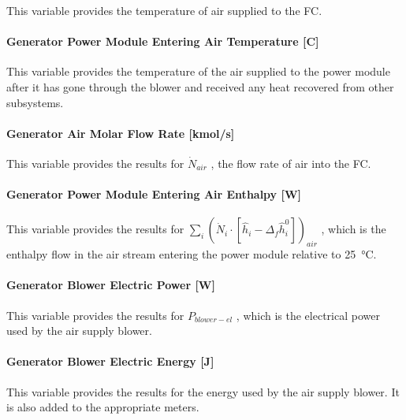 This variable provides the temperature of air supplied to the FC.

\paragraph{Generator Power Module Entering Air Temperature {[}C{]}}\label{generator-power-module-entering-air-temperature-c}

This variable provides the temperature of the air supplied to the power module after it has gone through the blower and received any heat recovered from other subsystems.

\paragraph{Generator Air Molar Flow Rate {[}kmol/s{]}}\label{generator-air-molar-flow-rate-kmols}

This variable provides the results for \({\dot N_{air}}\) , the flow rate of air into the FC.

\paragraph{Generator Power Module Entering Air Enthalpy {[}W{]}}\label{generator-power-module-entering-air-enthalpy-w}

This variable provides the results for \({\sum\limits_i {\left( {{{\dot N}_i} \cdot \left[ {{{\hat h}_i} - {\Delta_f}\hat h_i^0} \right]} \right)}_{air}}\) , which is the enthalpy flow in the air stream entering the power module relative to \SI{25}{\celsius}.

\paragraph{Generator Blower Electric Power {[}W{]}}\label{generator-blower-electric-power-w}

This variable provides the results for \({P_{blower - el}}\) , which is the electrical power used by the air supply blower.

\paragraph{Generator Blower Electric Energy {[}J{]}}\label{generator-blower-electric-energy-j}

This variable provides the results for the energy used by the air supply blower. It is also added to the appropriate meters.

